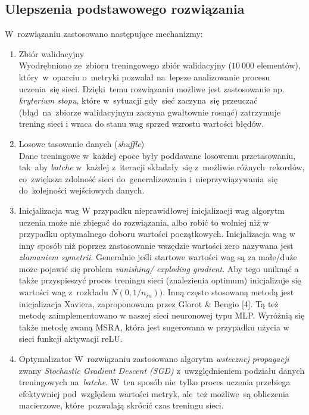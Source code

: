 \documentclass[11pt, a4paper]{article}
\begin{document}
\subsection{Ulepszenia podstawowego rozwiązania}
W~rozwiązaniu zastosowano następujące mechanizmy:
\begin{enumerate}
 \item Zbiór walidacyjny \\
 Wyodrębniono ze~zbioru treningowego zbiór walidacyjny ($10\:000$ elementów), który~w~oparciu o~metryki pozwalał na~lepsze analizowanie procesu uczenia~się sieci.
 Dzięki~temu rozwiązaniu możliwe jest zastosowanie np. \textit{kryterium stopu}, które w~sytuacji gdy~sieć zaczyna~się przeuczać (błąd~na~zbiorze walidacyjnym zaczyna gwałtownie rosnąć) zatrzymuje trening sieci i wraca do stanu wag sprzed wzrostu wartości błędów.
 
 
 \item Losowe tasowanie danych (\textit{shuffle}) \\
 Dane treningowe w~każdej epoce były poddawane losowemu przetasowaniu, tak~aby \textit{batche} w~każdej z~iteracji składały~się z~możliwie różnych~rekordów,
 co~zwiększa zdolność sieci do~generalizowania i~nieprzywiązywania~się do~kolejności wejściowych danych.
 
 \item Inicjalizacja wag \newline
 W przypadku nieprawidłowej inicjalizacji wag algorytm uczenia może nie zbiegać do rozwiązania, albo robić to wolniej niż w przypadku optymalnego doboru wartości początkowych. 
 Inicjalizacja wag w inny sposób niż poprzez zastosowanie wszędzie wartości zero nazywana jest \textit{złamaniem symetrii}. 
 Generalnie jeśli startowe wartości wag są za małe/duże może pojawić się problem \textit{vanishing/ exploding gradient}. Aby tego uniknąć a także przyspieszyć proces treningu sieci (znalezienia optimum) inicjalizuje się wartości wag z~rozkładu
 \(N(0,1/n_{in}))\). Inną często stosowaną metodą jest inicjalizacja Xaviera, zaproponowana przez Glorot \& Bengio [4]. Tą też metodę zaimplementowano w naszej sieci neuronowej typu MLP. 
  Wyróżnią się także metodę zwaną MSRA, która jest sugerowana w przypadku użycia w sieci funkcji aktywacji reLU.
 
  \item Optymalizator \newline
 W~rozwiązaniu zastosowano algorytm \textit{wstecznej propagacji} zwany \textit{Stochastic Gradient Descent (SGD)} z~uwzględnieniem podziału danych treningowych na~\textit{batche}.
 W~ten sposób nie~tylko proces uczenia przebiega efektywniej pod~względem wartości metryk, ale~też możliwe~są obliczenia macierzowe, które~pozwalają skrócić czas treningu sieci.
 

\end{enumerate}
\end{document}
